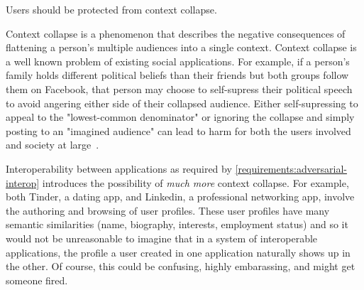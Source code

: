 


\begin{requirement}
\label{requirements:context-differentiation}
    Users should be protected from context collapse.
\end{requirement}

Context collapse is a phenomenon that describes the negative consequences of flattening
a person's multiple audiences into a single context.
Context collapse is a well known problem of existing social applications.
For example, if a person's family holds different political beliefs than their friends
but both groups follow them on Facebook, that person may choose to self-supress their political
speech to avoid angering either side of their collapsed audience.
Either self-supressing to appeal to the "lowest-common denominator" or ignoring the collapse
and simply posting to an "imagined audience" can lead to harm for both
the users involved and society at large~\cite{contextcollapse, contextcollapseimpact, contextcollapsequeer, spiralofsilencesocialmedia}.

Interoperability between applications as required by \ref{requirements:adversarial-interop} introduces the possibility
of \emph{much more} context collapse.
For example, both Tinder, a dating app, and Linkedin, a professional networking app, involve the authoring
and browsing of user profiles.
These user profiles have many semantic similarities (name, biography, interests, employment status) and so
it would not be unreasonable to imagine that in a system of interoperable applications,
the profile a user created in one application
naturally shows up in the other.
Of course, this could be confusing, highly embarassing, and might get someone fired.

